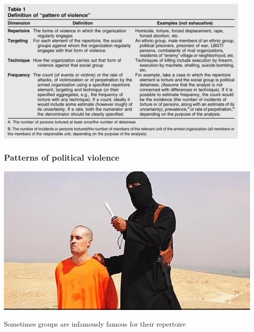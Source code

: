 \documentclass[aspectratio=43]{beamer}
\begin{document}
\begin{frame}
\includegraphics[width = 0.95\textwidth]{img/pattern_of_pv}

\vfill



\end{frame}

\begin{frame}
\frametitle{Patterns of political violence}
\centering

\includegraphics[width = \textwidth]{img/foley}

Sometimes groups are infamously famous for their repertoire

\end{frame}
\end{document}

